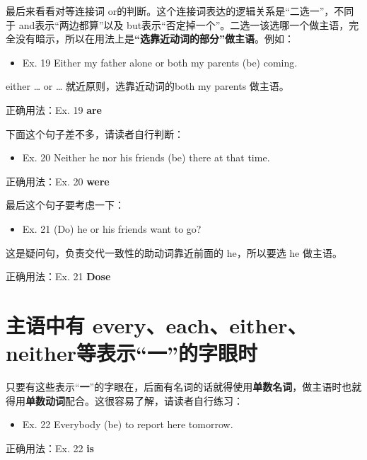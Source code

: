 最后来看看对等连接词 or的判断。这个连接词表达的逻辑关系是“二选一”，不同
于 and表示“两边都算”以及 but表示“否定掉一个”。二选一该选哪一个做主语，完
全没有暗示，所以在用法上是\textbf{“选靠近动词的部分”做主语}。例如：

\begin{mybox}

  \begin{itemize}
  \item   Ex. 19 Either my father alone or both my parents (be) coming.
  \end{itemize}

  either \ldots{} or \ldots{} 就近原则，选靠近动词的both my parents 做主语。

  \tcblower

  正确用法：Ex. 19 \textbf{are}
\end{mybox}

下面这个句子差不多，请读者自行判断：
\begin{mybox}
  \begin{itemize}
  \item   Ex. 20 Neither he nor his friends (be) there at that time.
  \end{itemize}

  \tcblower

  正确用法：Ex. 20 \textbf{were}
\end{mybox}

最后这个句子要考虑一下：

\begin{mybox}
  \begin{itemize}
  \item   Ex. 21 (Do) he or his friends want to go?
  \end{itemize}

  这是疑问句，负责交代一致性的助动词靠近前面的 he，所以要选 he 做主语。

  \tcblower

  正确用法：Ex. 21 \textbf{Dose}
\end{mybox}

\section{主语中有 every、each、either、neither等表示“一”的字眼时}

只要有这些表示“\textbf{一}”的字眼在，后面有名词的话就得使用\textbf{单数名词}，做主语时也就得用\textbf{单数动词}配合。这很容易了解，请读者自行练习：
\begin{mybox}

  \begin{itemize}
  \item   Ex. 22 Everybody (be) to report here tomorrow.
  \end{itemize}

  \tcblower

  正确用法：Ex. 22 \textbf{is}
\end{mybox}

